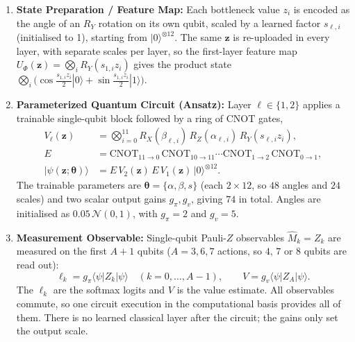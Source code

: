 \documentclass[10pt, a4paper]{article}
\begin{document}
\begin{enumerate}
    \item \textbf{State Preparation / Feature Map:} Each bottleneck value $z_i$ is encoded as the angle of an $R_Y$ rotation on its own qubit, scaled by a learned factor $s_{\ell,i}$ (initialised to 1), starting from $|0\rangle^{\otimes12}$. The same $\mathbf{z}$ is re-uploaded in every layer, with separate scales per layer, so the first-layer feature map $U_{\Phi}(\mathbf{z})=\bigotimes_i R_Y(s_{1,i}z_i)$ gives the product state $\bigotimes_i\big(\cos\tfrac{s_{1,i}z_i}{2}|0\rangle+\sin\tfrac{s_{1,i}z_i}{2}|1\rangle\big)$.
    \item \textbf{Parameterized Quantum Circuit (Ansatz):} Layer $\ell\in\{1,2\}$ applies a trainable single-qubit block followed by a ring of CNOT gates,
    \begin{align}
        V_\ell(\mathbf{z}) &= \bigotimes_{i=0}^{11} R_X(\beta_{\ell,i})\,R_Z(\alpha_{\ell,i})\,R_Y(s_{\ell,i}z_i),\\
        E &= \mathrm{CNOT}_{11\to0}\,\mathrm{CNOT}_{10\to11}\cdots\mathrm{CNOT}_{1\to2}\,\mathrm{CNOT}_{0\to1},\\
        |\psi(\mathbf{z};\boldsymbol{\theta})\rangle &= E\,V_2(\mathbf{z})\,E\,V_1(\mathbf{z})\,|0\rangle^{\otimes12}.
    \end{align}
    The trainable parameters are $\boldsymbol{\theta}=\{\alpha,\beta,s\}$ (each $2\times12$, so $48$ angles and $24$ scales) and two scalar output gains $g_\pi,g_v$, giving $74$ in total. Angles are initialised as $0.05\,\mathcal{N}(0,1)$, with $g_\pi=2$ and $g_v=5$.
    \item \textbf{Measurement Observable:} Single-qubit Pauli-$Z$ observables $\hat M_k=Z_k$ are measured on the first $A+1$ qubits ($A=3,6,7$ actions, so $4$, $7$ or $8$ qubits are read out):
    \begin{equation}
        \ell_k=g_\pi\langle\psi|Z_k|\psi\rangle\quad(k=0,\dots,A-1),\qquad V=g_v\langle\psi|Z_A|\psi\rangle .
    \end{equation}
    The $\ell_k$ are the softmax logits and $V$ is the value estimate. All observables commute, so one circuit execution in the computational basis provides all of them. There is no learned classical layer after the circuit; the gains only set the output scale.
\end{enumerate}
\end{document}
